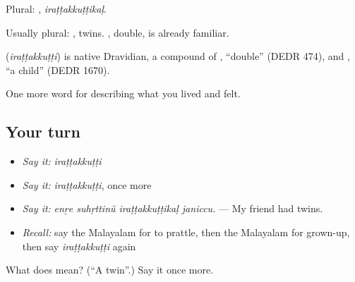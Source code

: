 Plural: , \emph{iraṭṭakkuṭṭikaḷ}.

Usually plural: , twins. , double, is already familiar.

\begin{cousinweb}
\textbf{} (\emph{iraṭṭakkuṭṭi}) is native Dravidian, a compound of , \textquotedblleft{}double\textquotedblright{} (DEDR 474), and , \textquotedblleft{}a child\textquotedblright{} (DEDR 1670).
\end{cousinweb}

\begin{grammarlens}[title={What you've built}]
One more word for describing what you lived and felt.
\end{grammarlens}

\subsection*{Your turn}
\begin{itemize}
\raggedright
  \item \emph{Say it:} \emph{iraṭṭakkuṭṭi}
  \item \emph{Say it:} \emph{iraṭṭakkuṭṭi}, once more
  \item \emph{Say it:} \emph{enṟe suhṛttinŭ iraṭṭakkuṭṭikaḷ janiccu.} — My friend had twins.
  \item \emph{Recall:} say the Malayalam for to prattle, then the Malayalam for grown-up, then say \emph{iraṭṭakkuṭṭi} again
\end{itemize}

\begin{tcolorbox}[breakable,colback=teal!4,colframe=teal!35!black,title={Before you move on}]
What does  mean? (\textquotedblleft{}A twin\textquotedblright{}.) Say it once more.
\end{tcolorbox}
